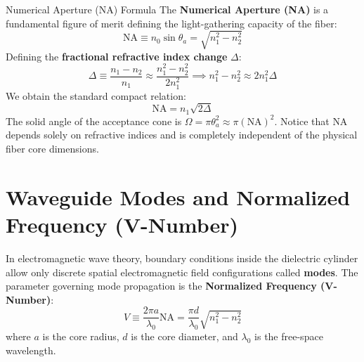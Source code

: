 \begin{derivbox}{Numerical Aperture ($\text{NA}$) Formula}
The \textbf{Numerical Aperture (NA)} is a fundamental figure of merit defining the light-gathering capacity of the fiber:
\begin{equation}
\text{NA} \equiv n_0 \sin\theta_a = \sqrt{n_1^2 - n_2^2}
\end{equation}
Defining the \textbf{fractional refractive index change} $\Delta$:
\begin{equation}
\Delta \equiv \frac{n_1 - n_2}{n_1} \approx \frac{n_1^2 - n_2^2}{2n_1^2} \implies n_1^2 - n_2^2 \approx 2 n_1^2 \Delta
\end{equation}
We obtain the standard compact relation:
\begin{equation}
\text{NA} = n_1 \sqrt{2\Delta}
\end{equation}
The solid angle of the acceptance cone is $\Omega = \pi \theta_a^2 \approx \pi (\text{NA})^2$. Notice that $\text{NA}$ depends solely on refractive indices and is completely independent of the physical fiber core dimensions.
\end{derivbox}

\section{Waveguide Modes and Normalized Frequency (V-Number)}
In electromagnetic wave theory, boundary conditions inside the dielectric cylinder allow only discrete spatial electromagnetic field configurations called \textbf{modes}. The parameter governing mode propagation is the \textbf{Normalized Frequency (V-Number)}:
\begin{equation}
V \equiv \frac{2\pi a}{\lambda_0} \text{NA} = \frac{\pi d}{\lambda_0}\sqrt{n_1^2 - n_2^2}
\end{equation}
where $a$ is the core radius, $d$ is the core diameter, and $\lambda_0$ is the free-space wavelength.

